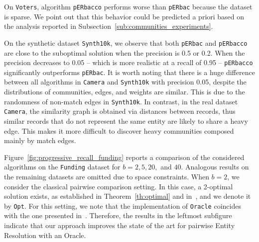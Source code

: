 \documentclass[sigconf, nonacm]{acmart}
\newcommand{\DD}{\texttt{Oracle}\xspace}
\newcommand{\perbacco}{\texttt{pERbacco}\xspace}
\newcommand{\perbac}{\texttt{pERbac}\xspace}
\newcommand{\camera}{\texttt{Camera}\xspace}
\newcommand{\funding}{\texttt{Funding}\xspace}
\newcommand{\voters}{\texttt{Voters}\xspace}
\newcommand{\synth}{\texttt{Synth10k}\xspace}
\begin{document}
On \voters, algorithm \perbacco performs worse than \perbac because the dataset is sparse. We point out that this behavior could be predicted a priori based on the analysis reported in Subsection~\ref{sub:communities_experiments}.

On the synthetic dataset \synth, we observe that both \perbac and \perbacco are close to the suboptimal solution when the precision is 0.5 or 0.2. When the precision decreases to 0.05 -- which is more realistic at a recall of 0.95 -- \perbacco significantly outperforms \perbac. 
It is worth noting that there is a huge difference between all algorithms in \camera and \synth with precision 0.05, despite the distributions of communities, edges, and weights are similar. This is due to the randomness of non-match edges in \synth. In contrast, in the real dataset \camera, the similarity graph is obtained via distances between records, thus similar records that do not represent the same entity are likely to share a heavy edge. 
This makes it more difficult to discover heavy communities composed mainly by match edges.


Figure~\ref{fig:progressive_recall_funding} reports a comparison of the considered algorithms on the \funding dataset for $b = 2, 5, 20,$ and $40$. Analogous results on the remaining datasets are omitted due to space constraints.
When $b = 2$, we consider the classical pairwise comparison setting. In this case, a 2-optimal solution exists, as established in Theorem~\ref{th:optimal} and in~\cite{firmani2016online}, and we denote it by \texttt{Opt}. 
For this setting, we note that the implementation of \DD coincides with the one presented in~\cite{firmani2016online}. Therefore, the results in the leftmost subfigure indicate that our approach improves the state of the art for pairwise Entity Resolution with an Oracle.
\end{document}
